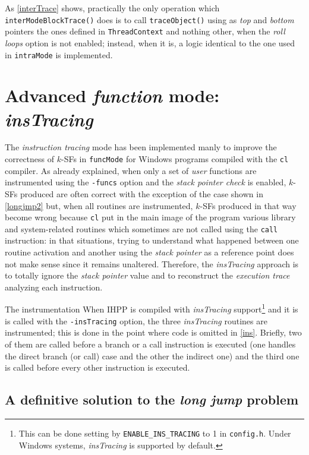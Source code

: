 \documentclass[a4paper,10pt]{report}
\begin{document}
\noindent
As \cref{interTrace} shows, practically the only operation
which \verb|interModeBlockTrace()| does is to call \verb|traceObject()|
using as \emph{top} and \emph{bottom} pointers the ones defined in \verb|ThreadContext|
and nothing other, when the \emph{roll loops} option is not enabled;
instead, when it is, a logic identical to the one used in \verb|intraMode| is implemented.

\section{Advanced \emph{function} mode: \emph{insTracing}}

The \emph{instruction tracing} mode has been implemented manly to
improve the correctness of $k$-SFs in \verb|funcMode| for Windows
programs compiled with the \verb|cl| compiler.
As already explained, when only a set of \emph{user} functions
are instrumented using the \verb|-funcs| option and the \emph{stack pointer check}
is enabled, $k$-SFs produced are often correct with the exception of the case
shown in \cref{longjmp2} but, when all routines are instrumented,
$k$-SFs produced in that way become wrong because \verb|cl| put in the main image
of the program various library and system-related routines which sometimes are not
called using the \verb|call| instruction: in that situations, trying
to understand what happened between one routine activation and another
using the \emph{stack pointer} as a reference point does not make sense
since it remains unaltered. Therefore, the \emph{insTracing} approach is to
totally ignore the \emph{stack pointer} value and to reconstruct the
\emph{execution trace} analyzing each instruction.

\begin{paragraph}{The instrumentation}
When IHPP is compiled with \emph{insTracing}
support\footnote{This can be done setting by \texttt{ENABLE\_INS\_TRACING} to 1 in \texttt{config.h}. Under Windows systems, \emph{insTracing} is supported by default.}
and it is is called with the \verb|-insTracing| option, the three \emph{insTracing}
routines are instrumented; this is done in the point where code is omitted
in \cref{ins}. Briefly, two of them are called before a branch or a call instruction
is executed (one handles the direct branch (or call) case and the other the indirect one)
and the third one is called before every other instruction is executed.
\end{paragraph}

\subsection{A definitive solution to the \emph{long jump} problem}
\end{document}
